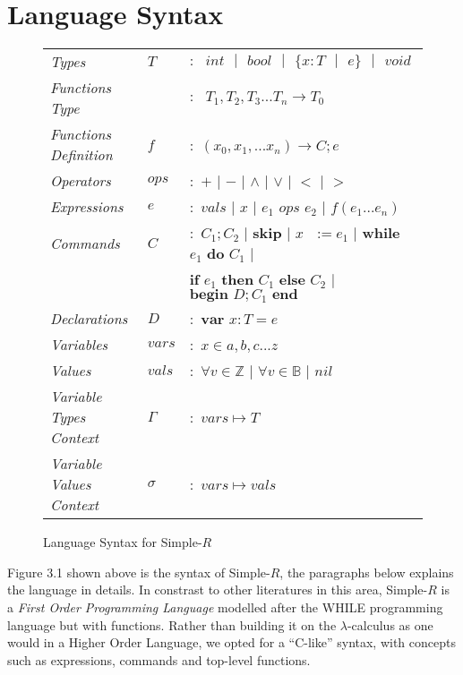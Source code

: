 \documentclass[a4paper,12pt]{report}
\begin{document}
\section{Language Syntax}
\begin{figure}[H]
  \begin{center}
    \begin{tabular}{l l l}
      \textit{Types} & $T$ & $:\text{ }int\text{ }|\text{ }bool\text{ }|
      \text{ }\{x: T\text{ }|\text{ }e\}\text{ }|\text{ }void$\\
      \textit{Functions Type} &  & $:\text{ }T_1, T_2,T_3...T_n\longrightarrow T_0$\\
      \textit{Functions Definition} & $f$ & $:$ $(x_0,x_1,...x_n) \longrightarrow C;e$\\
      \textit{Operators} & $ops$ & $:$ $+$ $|$ $-$ $|$ $\wedge$ $|$ $\vee$ $|$ $<$ $|$ $>$ \\
      \textit{Expressions} & $e$ & $:$ $vals$ $|$ $x$ $|$ $e_1$ $ops$ $e_2$ 
      $|$ $f(e_1...e_n)$ \\
      \textit{Commands} & $C$ & $:$ $C_1;C_2$ $|$ \textbf{skip} $|$ $x\text{ }:= e_1$ 
      $|$ \textbf{while} $e_1$ \textbf{do} $C_1$ $|$ \\ 
        & & \; \textbf{if} $e_1$ \textbf{then} $C_1$ \textbf{else} $C_2$ $|$ 
        $\textbf{begin } D;C_1\textbf{ end}$ \\
      \textit{Declarations} & $D$ & $:$ $\textbf{var } x : T = e$ \\
      \textit{Variables} & $vars$& $:$ $x \in {a,b,c...z}$\\
      \textit{Values} & $vals$& $:$ $\forall v \in \mathbb{Z}$ $|$ $\forall v \in \mathbb{B}$ 
        $|$ $nil$\\
      \textit{Variable Types Context} & $\Gamma$& $:$ $vars \mapsto T$\\
      \textit{Variable Values Context} & $\sigma$& $:$ $vars \mapsto vals$
    \end{tabular}
  \end{center}
  \caption{Language Syntax for Simple-$R$}
\end{figure}

\par
Figure 3.1 shown above is the syntax of Simple-$R$, the paragraphs below 
explains the language in details. In constrast to other literatures in this area, 
Simple-$R$ is a \textit{First Order Programming Language} \cite{FOL} modelled 
after the WHILE \cite{whileLanguage} programming language but with functions.
Rather than building it on the $\lambda$-calculus as one would in 
a Higher Order Language, we opted for a ``C-like'' syntax, with concepts such as 
expressions, commands and top-level functions.
\end{document}
